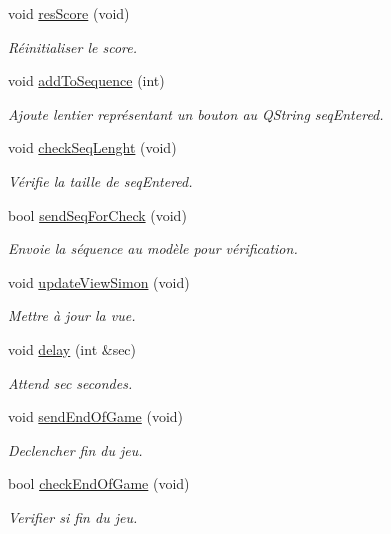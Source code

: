 \begin{DoxyCompactItemize}
void \hyperlink{class_super_simon_a9c3cccc53f6445c0bf03b30dd6528340}{res\+Score} (void)
\begin{DoxyCompactList}\small\item\em Réinitialiser le score. \end{DoxyCompactList}\item 
void \hyperlink{class_super_simon_aece1587ad880233a11cf24cbbe284a42}{add\+To\+Sequence} (int)
\begin{DoxyCompactList}\small\item\em Ajoute l\textquotesingle{}entier représentant un bouton au Q\+String seq\+Entered. \end{DoxyCompactList}\item 
void \hyperlink{class_super_simon_a4ea2f32b57775bd2c784472369127bcf}{check\+Seq\+Lenght} (void)
\begin{DoxyCompactList}\small\item\em Vérifie la taille de seq\+Entered. \end{DoxyCompactList}\item 
\mbox{\label{class_super_simon_a242ac18e5bcd7487bfd8a5b01b59669a}} 
bool \hyperlink{class_super_simon_a242ac18e5bcd7487bfd8a5b01b59669a}{send\+Seq\+For\+Check} (void)
\begin{DoxyCompactList}\small\item\em Envoie la séquence au modèle pour vérification. \end{DoxyCompactList}\item 
void \hyperlink{class_super_simon_a8d5c23562cd6b048720003d3c796ac7a}{update\+View\+Simon} (void)
\begin{DoxyCompactList}\small\item\em Mettre à jour la vue. \end{DoxyCompactList}\item 
void \hyperlink{class_super_simon_af12663f8a26a971a508a40a33d0afceb}{delay} (int \&sec)
\begin{DoxyCompactList}\small\item\em Attend sec secondes. \end{DoxyCompactList}\item 
\mbox{\label{class_super_simon_ad579e5ed8007a599d5074299c4bee712}} 
void \hyperlink{class_super_simon_ad579e5ed8007a599d5074299c4bee712}{send\+End\+Of\+Game} (void)
\begin{DoxyCompactList}\small\item\em Declencher fin du jeu. \end{DoxyCompactList}\item 
\mbox{\label{class_super_simon_a3834147e3d6956d918a9ef31c4a87c3d}} 
bool \hyperlink{class_super_simon_a3834147e3d6956d918a9ef31c4a87c3d}{check\+End\+Of\+Game} (void)
\begin{DoxyCompactList}\small\item\em Verifier si fin du jeu. \end{DoxyCompactList}\end{DoxyCompactItemize}


